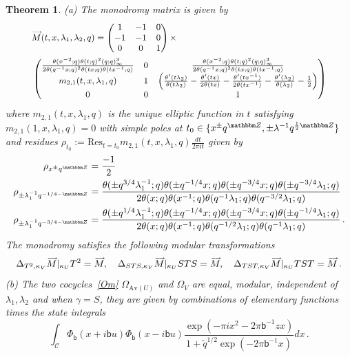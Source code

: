 \documentclass[12pt,reqno]{amsart}
\newtheorem{theorem}{Theorem}[section]
\theoremstyle{definition}
\def\BZ{\mathbbm Z}
\def\BR{\mathbbm R}
\def\calC{\mathcal C}
\def\tq{\tilde{q}}
\def\Res{\mathrm{Res}}
\def\ve{\varepsilon}
\def\be{\begin{equation}}
\def\ee{\end{equation}}
\def\sfb{\mathsf{b}}
\def\e{\bold e}
\def\Av{\mathrm{Av}}
\def\Om{\Omega}
\def\vM{\accentset{\longrightarrow}{M}}
\def\sfb{\mathsf{b}}
\begin{document}
\begin{theorem}
\label{thm.41c}
{\rm (a)} The monodromy matrix is given by
  \be
  {\small
\begin{aligned}
  \label{m3x3x}
&\vM(t,x,\lambda_{1},\lambda_{2},q)
=
\begin{pmatrix}
1 & -1 & 0\\
-1 & -1 & 0\\
0 & 0 & 1
\end{pmatrix} \times \\ 
&\begin{pmatrix}
  \frac{\theta(x^{-2};q)
    \theta(t;q)^2(q;q)_{\infty}^3}{2\theta(q^{-1}x;q)^2\theta(tx;q)\theta(tx^{-1};q)}
  & 0 & \frac{\theta(x^{-2};q)
  \theta(t;q)^2(q;q)_{\infty}^{3}}{2\theta(q^{-1}x;q)^2\theta(tx;q)\theta(tx^{-1};q)}\\
  m_{2,1}(t,x,\lambda_{1},q) & 1 &
  \left(\frac{\theta'(t\lambda_{2})}{\theta(t\lambda_{2})}
-\frac{\theta'(tx)}{2\theta(tx)}-\frac{\theta'(tx^{-1})}{2\theta(tx^{-1})}
-\frac{\theta'(\lambda_{2})}{\theta(\lambda_{2})}-\frac{1}{2}\right)\\
  0 & 0 & 1
\end{pmatrix}
\end{aligned}
  }
  \ee
  where $m_{2,1}(t,x,\lambda_{1},q)$ is the unique elliptic function in $t$
  satisfying $m_{2,1}(1,x,\lambda_{1},q)=0$ with simple poles at $t_0\in
\{x^{\pm}q^{\BZ},\pm\lambda^{-1}q^{\frac{1}{2}\BZ}\}$ and residues
$\rho_{t_0}:=\Res_{t=t_0}m_{2,1}(t,x,\lambda_{1},q)\frac{dt}{2\pi i t}$ given by
  \be
  \label{m21resx}
\begin{aligned}
  \rho_{x^{\pm}q^{\BZ}} &=
  \frac{-1}{2} \\
  \rho_{\pm\lambda_{1}^{-1}q^{-1/4-\BZ}} &=
  \frac{\theta(\pm q^{3/4}\lambda_{1}^{-1};q)\theta(\pm q^{-1/4}x;q)
\theta(\pm q^{-3/4}x;q)
\theta(\pm q^{-3/4}\lambda_{1};q)}{2\theta(x;q)\theta(x^{-1};q)
\theta(q^{-1}\lambda_{1};q)\theta(q^{-3/2}\lambda_{1};q)} \\
  \rho_{\pm\lambda_{1}^{-1}q^{-3/4-\BZ}} &=
  \frac{\theta(\pm q^{1/4}\lambda_{1}^{-1};q)\theta(\pm q^{-1/4}x;q)
  \theta(\pm q^{-3/4}x;q)
  \theta(\pm q^{-1/4}\lambda_{1};q)}{2\theta(x;q)\theta(x^{-1};q)
  \theta(q^{-1/2}\lambda_{1};q)\theta(q^{-1}\lambda_{1};q)}\,.
  \end{aligned}
  \ee
The monodromy satisfies the following modular transformations
\be
\label{M41x}
\Delta_{T^{2},\kappa_{V}}\vM|_{\kappa_{U}}T^2=\vM,\quad
\Delta_{STS,\kappa_{V}}\vM|_{\kappa_{U}}STS=\vM,\quad
\Delta_{TST,\kappa_{V}}\vM|_{\kappa_{U}}TST=\vM\,.
\ee
{\rm (b)}
The two cocycles~\eqref{Om} $\Om_{\Av(U)}$ and $\Om_{V}$ are equal,
modular, independent of $\lambda_{1},\lambda_{2}$ and when $\gamma=S$, they
are given by combinations of elementary functions times the state integrals
\be
\int_{\calC}
\Phi_{\sfb}(x+i\sfb u)\Phi_{\sfb}(x-i\sfb u)
\frac{\exp\left(-\pi i x^{2}-2\pi\sfb^{-1} zx\right)}{1+\tq^{1/2}
  \exp\left(-2\pi\sfb^{-1}x\right)}dx\,.
\ee
\end{theorem}
\end{document}
